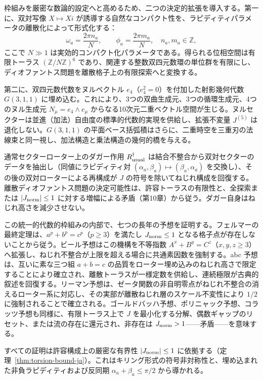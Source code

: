 \documentclass[dvipdfmx,a4paper]{article}
\theoremstyle{definition}
\theoremstyle{remark}
\newcommand{\Jnorm}{J_{\rm norm}}
\begin{document}
枠組みを厳密な数論的設定へと高めるため、二つの決定的拡張を導入する。第一に、双対写像 $X \mapsto Xi$ が誘導する自然なコンパクト性を、ラピディティパラメータの離散化によって形式化する：
\[
\omega_a = \frac{2\pi n_a}{N}, \qquad \phi_a = \frac{2\pi m_a}{N}, \quad n_a,m_a \in \mathbb{Z},
\]
ここで $N \gg 1$ は実効的コンパクト化パラメータである。得られる位相空間は有限トーラス $(\mathbb{Z}/N\mathbb{Z})^6$ であり、関連する整数双四元数環の単位群を有限にし、ディオファントス問題を離散格子上の有限探索へと変換する。

第二に、双四元数代数をヌルベクトル $e_4$（$e_4^2 = 0$）を付加した射影幾何代数 $G(3,1,1)$ に埋め込む。これにより、3つの双曲生成元、3つの循環生成元、4つのヌル生成元 $N_\mu = e_4 \wedge e_\mu$ からなる10次元二重ベクトル空間が生じる。ヌルセクターは並進（加法）自由度の標準的代数的実現を供給し、拡張不変量 $J^{(5)}$ は退化しない。$G(3,1,1)$ の平面ベース括弧積はさらに、二重時空を三重刃の法線束と同一視し、加法構造と乗法構造の幾何的橋を与える。

通常セクターローター上のダガー作用 $R_{\rm usual}^\dagger$ は結合不整合から双対セクターのデータを抽出し（同値にラピディティ対 $(\alpha_a,\beta_a)\mapsto(\beta_a,\alpha_a)$ を交換し）、その後の双対ローターによる再構成が $J$ の符号を除いてねじれ構成を回復する。離散ディオファントス問題の決定可能性は、許容トーラスの有限性と、全探索または $|\Jnorm|\le 1$ に対する増幅による矛盾（第10章）から従う。ダガー自身はねじれ高さを減少させない。

この統一的代数的枠組みの内部で、七つの長年の予想を証明する。フェルマーの最終定理は、$a^p + b^p = c^p$（$p \geq 3$）を満たし $\Jnorm \leq 1$ となる格子点が存在しないことから従う。ビール予想はこの機構を不等指数 $A^x + B^y = C^z$（$x,y,z \geq 3$）へ拡張し、ねじれ不整合が上限を超える場合に共通素因数を強制する。abc 予想は、互いに素な三つ組 $a + b = c$ の品質をローター埋め込みのねじれ高さで限定することにより確立され、離散トーラスが一様定数を供給し、連続極限が古典的叙述を回復する。リーマン予想は、ゼータ関数の非自明零点がねじれ不整合の消えるローター系に対応し、その実部が離散ねじれ層のスケール不変性により $1/2$ に強制されることで確立される。ゴールドバッハ予想、ポリニャック予想、コラッツ予想も同様に、有限トーラス上で $J$ を最小化する分解、偶数ギャップのリセット、または流の存在に還元され、非存在は $\Jnorm > 1$——矛盾——を意味する。

すべての証明は許容構成上の厳密な有界性 $|\Jnorm| \leq 1$ に依拠する（定理~\ref{thm:torsion-bound-ja}）。これはキリング形式の符号非対称性と、埋め込まれた非負ラピディティおよび反同期 $\alpha_a + \beta_a \leq \pi/2$ から導かれる。
\end{document}
